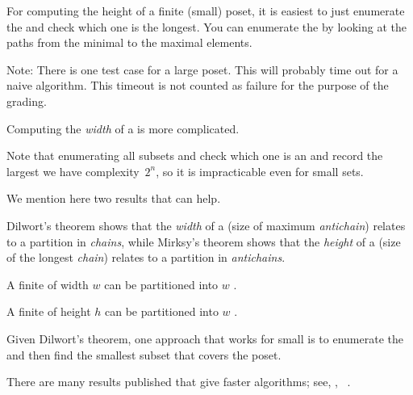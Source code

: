 

\begin{hint}
    For computing the height of a finite (small) poset, it is easiest to just enumerate the  and check which one is the longest.
    You can enumerate the  by looking at the paths from the minimal to the maximal elements.
\end{hint}

Note: There is one test case for a large poset.
This will probably time out for a naive algorithm.
This timeout is not counted as failure for the purpose of the grading.

\begin{hint}
    Computing the \emph{width} of a  is more complicated.

    Note that enumerating all subsets and check which one is an  and record the largest we have complexity~$2^n$, so it is impracticable even for small sets.

    We mention here two results that can help.

    Dilwort's theorem shows that the \emph{width} of a  (size of maximum \emph{antichain}) relates to a partition in \emph{chains}, while Mirksy's theorem shows that the \emph{height} of a  (size of the longest \emph{chain}) relates to a partition in \emph{antichains}.

    \begin{theorem}
        \label{thm:dilwort}
        A finite  of width $w$ can be partitioned into $w$ .
    \end{theorem}

    \begin{theorem}
        \label{thm:mirsky}
        A finite  of height $h$ can be partitioned into $w$ .
    \end{theorem}

    Given Dilwort's theorem, one approach that works for small  is to enumerate the  and then find the smallest subset that covers the poset.

    There are many results published that give faster algorithms; see, \eg, ~\cite{chen12decomposition}.

\end{hint}


